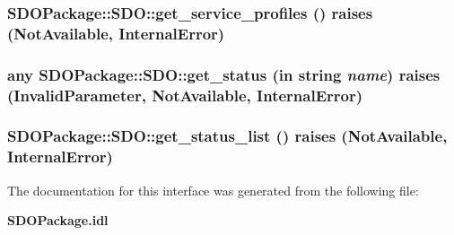 \subsubsection{ SDOPackage::SDO::get\_\-service\_\-profiles ()  raises (Not\-Available, Internal\-Error)}\label{interfaceSDOPackage_1_1SDO_SDOPackage_1_1SDOa3}


\subsubsection{\setlength{\rightskip}{0pt plus 5cm}any SDOPackage::SDO::get\_\-status (in string {\em name})  raises (Invalid\-Parameter, Not\-Available, Internal\-Error)}\label{interfaceSDOPackage_1_1SDO_SDOPackage_1_1SDOa10}


\subsubsection{ SDOPackage::SDO::get\_\-status\_\-list ()  raises (Not\-Available, Internal\-Error)}\label{interfaceSDOPackage_1_1SDO_SDOPackage_1_1SDOa9}




The documentation for this interface was generated from the following file:\begin{CompactItemize}
\item 
{\bf SDOPackage.idl}\end{CompactItemize}
